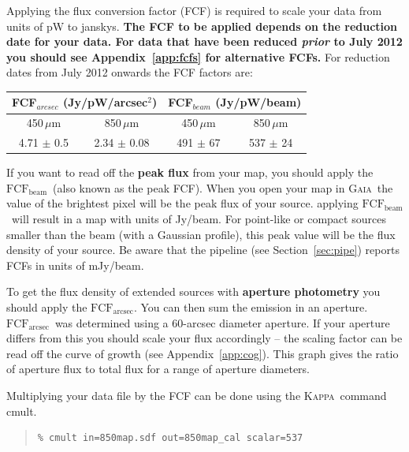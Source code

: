 \documentclass[twoside,11pt]{article}
\newcommand{\xref}[3]{#1}
\renewcommand{\_}{\texttt{\symbol{95}}}
\newenvironment{myquote}{\begin{quote}\begin{small}}{\end{small}\end{quote}}
\newcommand{\fcfb}{$\mathrm{FCF_{beam}}$}
\newcommand{\fcfa}{$\mathrm{FCF_{arcsec}}$}
\newcommand{\gaia}{\xref{\textsc{Gaia}}{sun214}{}}
\newcommand{\Kappa}{\xref{\textsc{Kappa}}{sun95}{}}
\newcommand{\task}[1]{\textsf{#1}}
\newcommand{\cmult}{\xref{\task{cmult}}{sun95}{CMULT}}
\begin{document}
Applying the flux conversion factor (FCF) is required to scale your
data from units of pW to janskys. \textbf{The FCF to be applied
depends on the reduction date for your data. For data that have been
reduced \emph{prior} to July 2012 you should see
Appendix~\ref{app:fcfs} for alternative FCFs.} For reduction dates
from July 2012 onwards the FCF factors are:
\begin{table}[h!]
\centering
\begin{tabular}{|c|c|c|c|}
\hline
\multicolumn{2}{|c|}{FCF$_{arcsec}$ (Jy/pW/arcsec$^2$) }  &
\multicolumn{2}{c|}{FCF$_{beam}$ (Jy/pW/beam)}      \\
\hline
\hspace{0.4cm} 450\,$\mu$m \hspace{0.3cm} & 850\,$\mu$m & \hspace{0.4cm} 450\,$\mu$m \hspace{0.3cm}& 850\,$\mu$m \\
\hline
4.71 $\pm$ 0.5& 2.34 $\pm$ 0.08& 491 $\pm$ 67& 537 $\pm$ 24 \\
\hline
\end{tabular}
\end{table}

If you want to read off the \textbf{peak flux} from your map, you
should apply the \fcfb\ (also known as the peak FCF). When you open
your map in \gaia\ the value of the brightest pixel will be the peak
flux of your source. applying \fcfb\ will result in a map with units
of Jy/beam. For point-like or compact sources smaller than the beam
(with a Gaussian profile), this peak value will be the flux density of
your source. Be aware that the pipeline (see Section~\ref{sec:pipe})
reports FCFs in units of mJy/beam.

To get the flux density of extended sources with \textbf{aperture
photometry} you should apply the \fcfa.  You can then sum the emission
in an aperture. \fcfa\ was determined using a 60-arcsec diameter
aperture. If your aperture differs from this you should scale your
flux accordingly -- the scaling factor can be read off the curve of
growth (see Appendix~\ref{app:cog}). This graph gives the ratio of
aperture flux to total flux for a range of aperture diameters.

Multiplying your data file by the FCF can be done using the \Kappa\
command \cmult.
\begin{myquote}
\begin{verbatim}
% cmult in=850map.sdf out=850map_cal scalar=537
\end{verbatim}
\end{myquote}
\end{document}
